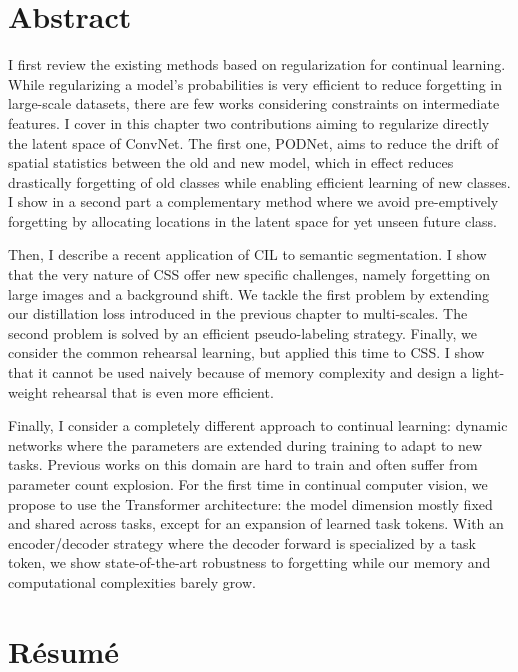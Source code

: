\cleardoublepage
\setcounter{page}{1}

\chapter{Abstract}

I first review the existing methods based on regularization for continual learning. While
regularizing a model's probabilities is very efficient to reduce forgetting in large-scale datasets,
there are few works considering constraints on intermediate features. I cover in this chapter two
contributions aiming to regularize directly the latent space of \acs{ConvNet}. The first one,
PODNet, aims to reduce the drift of spatial statistics between the old and new model, which in
effect reduces drastically forgetting of old classes while enabling efficient learning of new
classes. I show in a second part a complementary method where we avoid pre-emptively forgetting by
allocating locations in the latent space for yet unseen future class.

Then, I describe a recent application of \acf{CIL} to semantic segmentation. I show that
the very nature of \acf{CSS} offer new specific challenges, namely forgetting on large
images and a background shift. We tackle the first problem by extending our distillation
loss introduced in the previous chapter to multi-scales. The second problem is solved by
an efficient pseudo-labeling strategy. Finally, we consider the common rehearsal learning,
but applied this time to \ac{CSS}. I show that it cannot be used naively because of memory
complexity and design a light-weight rehearsal that is even more efficient.

Finally, I consider a completely different approach to continual learning: dynamic networks
where the parameters are extended during training to adapt to new tasks. Previous works on
this domain are hard to train and often suffer from parameter count explosion. For the
first time in continual computer vision, we propose to use the Transformer architecture:
the model dimension mostly fixed and shared across tasks, except for an
expansion of learned task tokens. With an encoder/decoder strategy where the decoder
forward is specialized by a task token, we show state-of-the-art robustness to forgetting
while our memory and computational complexities barely grow.


\cleardoublepage


\chapter{R\'esum\'e}

